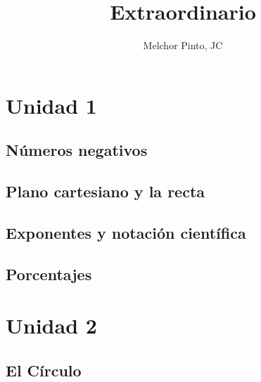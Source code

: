 \documentclass[repaso]{RDS_unit}
\title{Extraordinario}
\author{Melchor Pinto, JC}
\begin{document}
    \begin{questions}
    \section{Unidad 1}

\subsection{Números negativos}


% 


\subsection{Plano cartesiano y la recta}
	

%
% 
%

\subsection{Exponentes y notación científica}




    \newpage

    \subsection{Porcentajes}

% 


    \section{Unidad 2}

    \subsection{El Círculo}
	   

\end{questions}
\end{document}
